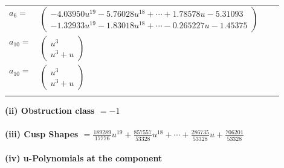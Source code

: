 \documentclass[1p]{elsarticle_modified}
\theoremstyle{definition}
\begin{document}
\begin{tabular}{m{7pt} m{180pt} m{7pt} m{180pt} }
\flushright $a_{6}=$&$\begin{pmatrix}-4.03950 u^{19}-5.76028 u^{18}+\cdots+1.78578 u-5.31093\\-1.32933 u^{19}-1.83018 u^{18}+\cdots-0.265227 u-1.45375\end{pmatrix}$ \\
\flushright $a_{10}=$&$\begin{pmatrix}u^3\\u^3+u\end{pmatrix}$\\ \flushright $a_{10}=$&$\begin{pmatrix}u^3\\u^3+u\end{pmatrix}$\\&\end{tabular}
\flushleft \textbf{(ii) Obstruction class $= -1$}\\~\\
\flushleft \textbf{(iii) Cusp Shapes $= \frac{189289}{17776} u^{19}+\frac{857557}{53328} u^{18}+\cdots+\frac{286735}{53328} u+\frac{706201}{53328}$}\\~\\
\newpage\renewcommand{\arraystretch}{1}
\flushleft \textbf{(iv) u-Polynomials at the component}\newline \\
\end{document}
